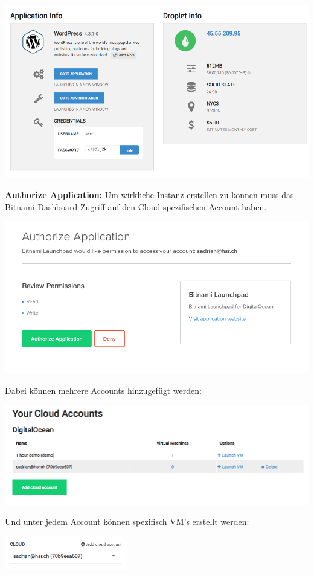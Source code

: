 \documentclass[11pt]{scrartcl}
\begin{document}
\includegraphics[width=\textwidth]{digitalocean_infos}

\textbf{Authorize Application:}
Um wirkliche Instanz erstellen zu können muss das Bitnami Dashboard Zugriff auf 
den Cloud spezifischen Account haben.

\includegraphics[width=\textwidth]{digitalocean_authorize}

Dabei können mehrere Accounts hinzugefügt werden:

\includegraphics[width=\textwidth]{digitalocean_accounts}

Und unter jedem Account können spezifisch VM's erstellt werden:

\includegraphics[width=0.4\textwidth]{digitalocean_account_specific}
\end{document}
